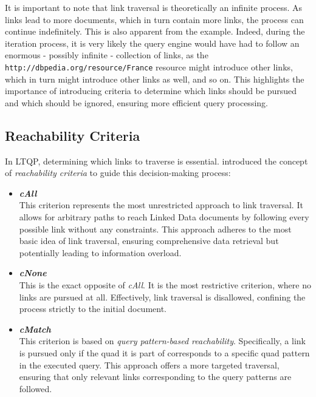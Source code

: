 It is important to note that link traversal is theoretically an infinite process. As links lead to more documents, which in turn contain more links, the process can continue indefinitely. This is also apparent from the example. Indeed, during the iteration process, it is very likely the query engine would have had to follow an enormous - possibly infinite - collection of links, as the \texttt{http://dbpedia.org/resource/France} resource might introduce other links, which in turn might introduce other links as well, and so on. This highlights the importance of introducing criteria to determine which links should be pursued and which should be ignored, ensuring more efficient query processing. \citep{taelman2023ltqp} \citep{hartig2012foundations}

\subsection{Reachability Criteria}
\label{subsec:reachability_criteria}

In LTQP, determining which links to traverse is essential. \citet{hartig2012foundations} introduced the concept of \textit{reachability criteria} to guide this decision-making process:
\begin{itemize}
    \item \textbf{\textit{cAll}}\\
    This criterion represents the most unrestricted approach to link traversal. It allows for arbitrary paths to reach Linked Data documents by following every possible link without any constraints. This approach adheres to the most basic idea of link traversal, ensuring comprehensive data retrieval but potentially leading to information overload.
    
    \item \textbf{\textit{cNone}}\\
    This is the exact opposite of \textit{cAll}. It is the most restrictive criterion, where no links are pursued at all. Effectively, link traversal is disallowed, confining the process strictly to the initial document.
    
    \item \textbf{\textit{cMatch}}\\
    This criterion is based on \textit{query pattern-based reachability}. Specifically, a link is pursued only if the quad it is part of corresponds to a specific quad pattern in the executed query. This approach offers a more targeted traversal, ensuring that only relevant links corresponding to the query patterns are followed.
\end{itemize}
\citep{hartig2012foundations}

